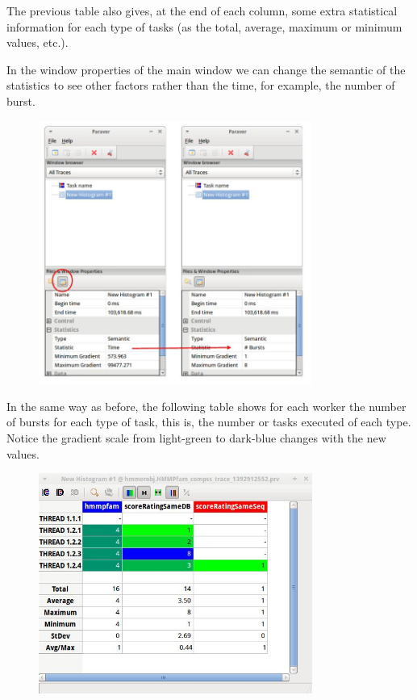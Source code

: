The previous table also gives, at the end of each column, some extra statistical 
information for each type of tasks (as the total, average, maximum or minimum values, etc.).

In the window properties of the main window we can change the semantic of the statistics 
to see other factors rather than the time, for example, the number of burst.

\begin{figure}[ht!]
  \centering
    \includegraphics[width=0.8\textwidth]{./Sections/7_Tracing/Figures/14.jpeg}
\end{figure}

In the same way as before, the following table shows for each worker the number of bursts 
for each type of task, this is, the number or tasks executed of each type. Notice the gradient 
scale from light-green to dark-blue changes with the new values.

\begin{figure}[ht!]
  \centering
    \includegraphics[width=0.8\textwidth]{./Sections/7_Tracing/Figures/15.jpeg}
\end{figure}

